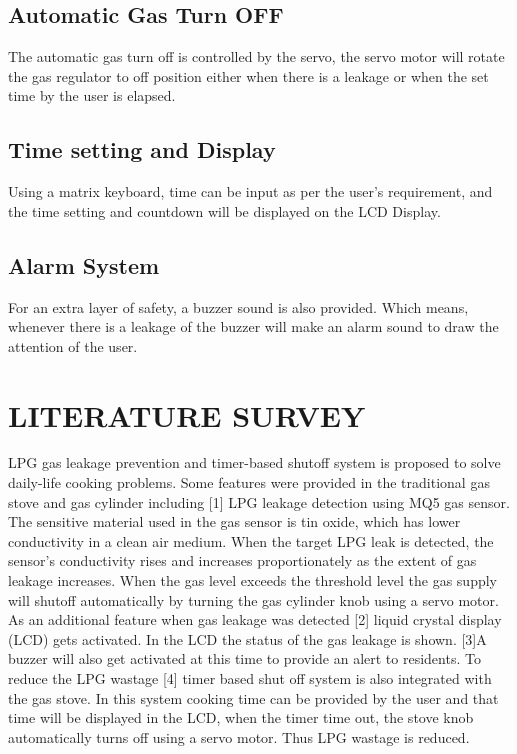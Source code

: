 \documentclass[a4paper,12pt]{report}
\begin{document}
\section{Automatic Gas Turn OFF}
The automatic gas turn off is controlled by the servo, the servo motor will rotate the gas regulator
to off position either when there is a leakage or when the set time by the user is elapsed.

\section{Time setting and Display}
Using a matrix keyboard, time can be input as per the user's requirement, and the time setting and
countdown will be displayed on the LCD Display.

\section{Alarm System}
For an extra layer of safety, a buzzer sound is also provided. Which means, whenever there is a
leakage of the buzzer will make an alarm sound to draw the attention of the user.

\chapter{LITERATURE SURVEY}
LPG gas leakage prevention and timer-based shutoff system is proposed to solve daily-life cooking
problems. Some features were provided in the traditional gas stove and gas cylinder including
[1] LPG leakage detection using MQ5 gas sensor. The sensitive material used in the gas sensor is
tin oxide, which has lower conductivity in a clean air medium. When the target LPG leak is
detected, the sensor’s conductivity rises and increases proportionately as the extent of gas leakage
increases. When the gas level exceeds the threshold level the gas supply will shutoff automatically
by turning the gas cylinder knob using a servo motor. As an additional feature when gas leakage
was detected [2] liquid crystal display (LCD) gets activated. In the LCD the status of the gas
leakage is shown. [3]A buzzer will also get activated at this time to provide an alert to residents.
To reduce the LPG wastage [4] timer based shut off system is also integrated with the gas stove.
In this system cooking time can be provided by the user and that time will be displayed in the
LCD, when the timer time out, the stove knob automatically turns off using a servo motor. Thus
LPG wastage is reduced.
\end{document}
